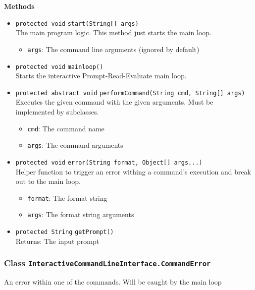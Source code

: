 \textbf{Methods}
\begin{itemize}
\item \lstinline|protected void| \lstinline|start|\lstinline|(String[] args)|\\
The main program logic. This method just starts the main loop.
\begin{itemize}
\item \lstinline|args|: The command line arguments (ignored by default)
\end{itemize}



\item \lstinline|protected void| \lstinline|mainloop|\lstinline|()|\\
Starts the interactive Prompt-Read-Evaluate main loop.



\item \lstinline|protected abstract void| \lstinline|performCommand|\lstinline|(String cmd, String[] args)|\\
Executes the given command with the given arguments. Must be implemented by subclasses.
\begin{itemize}
\item \lstinline|cmd|: The command name
\item \lstinline|args|: The command arguments
\end{itemize}



\item \lstinline|protected void| \lstinline|error|\lstinline|(String format, Object[] args...)|\\
Helper function to trigger an error withing a command's execution and break out to
 the main loop.
\begin{itemize}
\item \lstinline|format|: The format string
\item \lstinline|args|: The format string arguments
\end{itemize}



\item \lstinline|protected String| \lstinline|getPrompt|\lstinline|()|\\
Returns: The input prompt



\end{itemize}

\subsubsection{Class \lstinline|InteractiveCommandLineInterface.CommandError|}
An error within one of the commands. Will be caught by the main loop \\



